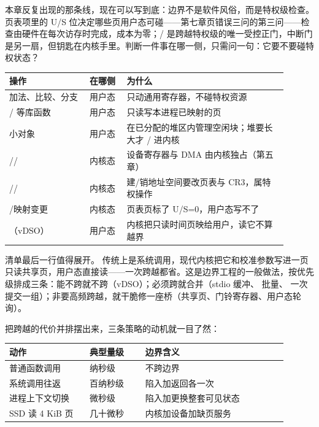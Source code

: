 本章反复出现的那条线，现在可以写到底：边界不是软件风俗，而是特权级检查。页表项里的 U/S 位决定哪些页用户态可碰——第七章页错误三问的第三问——检查由硬件在每次访存时完成，成本为零；/ 是跨越特权级的唯一受控正门，中断门是另一扇，但钥匙在内核手里。判断一件事在哪一侧，只需问一句：它要不要碰特权状态？

\begin{longtable}{L{0.26\linewidth}L{0.12\linewidth}L{0.52\linewidth}}
\toprule
操作 & 在哪侧 & 为什么 \\
\midrule
加法、比较、分支 & 用户态 & 只动通用寄存器，不碰特权资源 \\
/ 等库函数 & 用户态 & 只读写本进程已映射的页 \\
 小对象 & 用户态 & 在已分配的堆区内管理空闲块；堆要长大才 / 进内核 \\
// & 内核态 & 设备寄存器与 DMA 由内核独占（第五章） \\
// & 内核态 & 建/销地址空间要改页表与 CR3，属特权操作 \\
/映射变更 & 内核态 & 页表页标了 U/S=0，用户态写不了 \\
（vDSO） & 用户态 & 内核把只读时间页映给用户，读它不算越界 \\
\bottomrule
\end{longtable}

清单最后一行值得展开。 传统上是系统调用，现代内核把它和校准参数写进一页只读共享页，用户态直接读——一次跨越都省。这是边界工程的一般做法，按优先级排成三条：能不跨就不跨（vDSO）；必须跨就合并（stdio 缓冲、 批量、 一次提交一组）；非要高频跨越，就干脆修一座桥（共享页、门铃寄存器、用户态轮询）。

把跨越的代价并排摆出来，三条策略的动机就一目了然：

\begin{longtable}{L{0.26\linewidth}L{0.18\linewidth}L{0.46\linewidth}}
\toprule
动作 & 典型量级 & 边界含义 \\
\midrule
普通函数调用 & 纳秒级 & 不跨边界 \\
系统调用往返 & 百纳秒级 & 陷入加返回各一次 \\
进程上下文切换 & 微秒级 & 陷入加更换整套可见状态 \\
SSD 读 4 KiB 页 & 几十微秒 & 内核加设备加缺页服务 \\
\bottomrule
\end{longtable}

